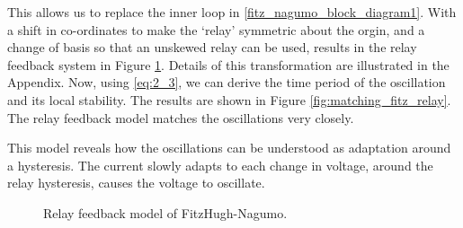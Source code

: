\documentclass[a4paper, 12pt]{article}
\begin{document}
This allows us to replace the inner loop in \ref{fitz_nagumo_block_diagram1}. With a shift in co-ordinates to make the `relay' symmetric about the orgin, and a change of basis so that an unskewed relay can be used, results in the relay feedback system in Figure \ref{fig:fitz_nagumo_relay_block_diagram}. Details of this transformation are illustrated in the Appendix. Now, using \ref{eq:2_3}, we can derive the time period of the oscillation and its local stability. The results are shown in Figure \ref{fig:matching_fitz_relay}. The relay feedback model matches the oscillations very closely. 

This model reveals how the oscillations can be understood as adaptation around a hysteresis. The current slowly adapts to each change in voltage, around the relay hysteresis, causes the voltage to oscillate. 

\begin{figure}[h!]

\caption{Relay feedback model of FitzHugh-Nagumo.}
\label{fig:fitz_nagumo_relay_block_diagram}
\end{figure}
\end{document}
